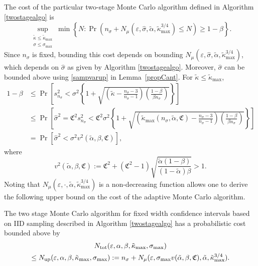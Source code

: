 \documentclass[graybox]{svmult}
\newcommand{\fudge}{\mathfrak{C}}
\newcommand{\Prob}{\Pr}
\newcommand{\hsigma}{\hat{\sigma}}
\newcommand{\talpha}{\tilde{\alpha}}
\newcommand{\tkappa}{\tilde{\kappa}}
\begin{document}
The cost of the particular two-stage Monte Carlo algorithm defined in Algorithm \ref{twostagealgo} is
\begin{equation}
\sup_{\substack{\tkappa \le \tkappa_{\max} \\ \sigma \le \sigma_{\max}}} \min\left\{N : \Prob(n_{\sigma} + N_{\mu}(\varepsilon,\hsigma,\tilde\alpha,\tilde\kappa_{\max}^{3/4}) \le N) \ge 1-\beta  \right \}.
\end{equation}
Since $n_{\sigma}$ is fixed, bounding this cost depends on bounding $N_{\mu}(\varepsilon,\hsigma,\tilde\alpha,\tilde\kappa_{\max}^{3/4})$, which depends on $\hsigma$ as given by Algorithm \ref{twostagealgo}.  Moreover, $\hsigma$ can be bounded above using \eqref{sampvarup} in Lemma~\ref{propCant}.  For $\tkappa \le \tkappa_{\max}$, 
\begin{align*}
1-\beta & \le \Prob\left[s^2_{n_{\sigma}} < \sigma^2 \left\{1 + \sqrt{\left ( \tkappa  - \frac{n_{\sigma}-3}{n_{\sigma}-1}\right)\left(\frac{1-\beta}{\beta n_{\sigma}}\right)}\right\} \right] \\
& \le \Prob\left[\hsigma^2 = \fudge^2 s^2_{n_{\sigma}} < \fudge^2\sigma^2 \left\{1 + \sqrt{\left ( \tkappa_{\max}(n_{\sigma},\talpha,\fudge)  - \frac{n_{\sigma}-3}{n_{\sigma}-1}\right)\left(\frac{1-\beta}{\beta n_{\sigma}}\right)}\right\} \right] \\
& = \Prob\left[\hsigma^2 < \sigma^2 v^2(\talpha,\beta,\fudge) \right],
\end{align*}
where
\[
v^2(\talpha,\beta,\fudge) :=  \fudge^2 + \left(\fudge^2 - 1\right)\sqrt{\frac{ \talpha(1-\beta)}{(1-\talpha)\beta} } > 1.
\]
Noting that $N_{\mu}(\varepsilon,\cdot,\tilde\alpha,\tilde\kappa_{\max}^{3/4})$ is a non-decreasing function allows one to derive the following upper bound on the cost of the adaptive Monte Carlo algorithm.

\begin{theorem} \label{costtheorem} The two stage Monte Carlo algorithm for fixed width confidence intervals based on IID sampling described in Algorithm \ref{twostagealgo} has a probabilistic cost bounded above by 
\begin{multline*}
N_{\rm{tot}}(\varepsilon,\alpha, \beta, \tkappa_{\max}, \sigma_{\max}) \\
\le
N_{\rm{up}}(\varepsilon,\alpha, \beta, \tkappa_{\max}, \sigma_{\max}) :=  n_{\sigma} + N_{\mu}(\varepsilon,\sigma_{\max}v(\talpha,\beta,\fudge),\talpha,\tkappa_{\max}^{3/4}) .
\end{multline*} 
\end{theorem}
\end{document}
